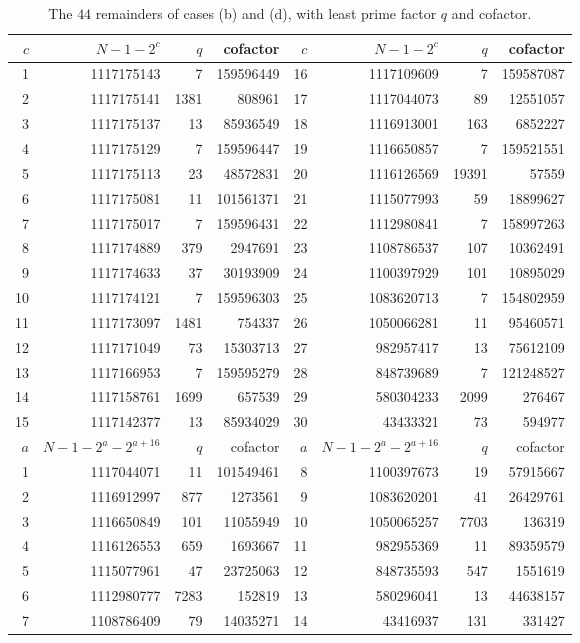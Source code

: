 \documentclass[11pt]{amsart}
\theoremstyle{plain}
\theoremstyle{definition}
\begin{document}
\begin{table}[ht]
\centering
\footnotesize
\setlength{\tabcolsep}{4pt}
\begin{tabular}{rrrr@{\qquad}rrrr}
\toprule
$c$ & $N-1-2^c$ & $q$ & cofactor & $c$ & $N-1-2^c$ & $q$ & cofactor\\
\midrule
1 & 1117175143 & 7 & 159596449 & 16 & 1117109609 & 7 & 159587087 \\
2 & 1117175141 & 1381 & 808961 & 17 & 1117044073 & 89 & 12551057 \\
3 & 1117175137 & 13 & 85936549 & 18 & 1116913001 & 163 & 6852227 \\
4 & 1117175129 & 7 & 159596447 & 19 & 1116650857 & 7 & 159521551 \\
5 & 1117175113 & 23 & 48572831 & 20 & 1116126569 & 19391 & 57559 \\
6 & 1117175081 & 11 & 101561371 & 21 & 1115077993 & 59 & 18899627 \\
7 & 1117175017 & 7 & 159596431 & 22 & 1112980841 & 7 & 158997263 \\
8 & 1117174889 & 379 & 2947691 & 23 & 1108786537 & 107 & 10362491 \\
9 & 1117174633 & 37 & 30193909 & 24 & 1100397929 & 101 & 10895029 \\
10 & 1117174121 & 7 & 159596303 & 25 & 1083620713 & 7 & 154802959 \\
11 & 1117173097 & 1481 & 754337 & 26 & 1050066281 & 11 & 95460571 \\
12 & 1117171049 & 73 & 15303713 & 27 & 982957417 & 13 & 75612109 \\
13 & 1117166953 & 7 & 159595279 & 28 & 848739689 & 7 & 121248527 \\
14 & 1117158761 & 1699 & 657539 & 29 & 580304233 & 2099 & 276467 \\
15 & 1117142377 & 13 & 85934029 & 30 & 43433321 & 73 & 594977 \\
\midrule
$a$ & $N-1-2^a-2^{a+16}$ & $q$ & cofactor & $a$ & $N-1-2^a-2^{a+16}$ & $q$ & cofactor\\
\midrule
1 & 1117044071 & 11 & 101549461 & 8 & 1100397673 & 19 & 57915667 \\
2 & 1116912997 & 877 & 1273561 & 9 & 1083620201 & 41 & 26429761 \\
3 & 1116650849 & 101 & 11055949 & 10 & 1050065257 & 7703 & 136319 \\
4 & 1116126553 & 659 & 1693667 & 11 & 982955369 & 11 & 89359579 \\
5 & 1115077961 & 47 & 23725063 & 12 & 848735593 & 547 & 1551619 \\
6 & 1112980777 & 7283 & 152819 & 13 & 580296041 & 13 & 44638157 \\
7 & 1108786409 & 79 & 14035271 & 14 & 43416937 & 131 & 331427 \\
\bottomrule
\end{tabular}
\caption{The $44$ remainders of cases (b) and (d), with least prime factor $q$ and cofactor.}
\label{tab:residual}
\end{table}
\end{document}
